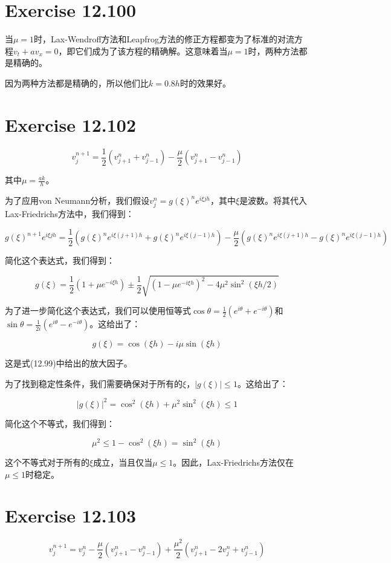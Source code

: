 \documentclass[twoside,a4paper]{article}
\begin{document}
\section{Exercise 12.100}
当$\mu = 1$时，Lax-Wendroff方法和Leapfrog方法的修正方程都变为了标准的对流方程$v_t + av_x = 0$，即它们成为了该方程的精确解。这意味着当$\mu = 1$时，两种方法都是精确的。

因为两种方法都是精确的，所以他们比$k=0.8h$时的效果好。
\section{Exercise 12.102}
$$
v_j^{n+1} = \frac{1}{2}(v_{j+1}^n + v_{j-1}^n) - \frac{\mu}{2}(v_{j+1}^n - v_{j-1}^n)
$$

其中$\mu = \frac{ak}{h}$。

为了应用von Neumann分析，我们假设$v_j^n = g(\xi)^ne^{i\xi jh}$，其中$\xi$是波数。将其代入Lax-Friedrichs方法中，我们得到：

$$
g(\xi)^{n+1}e^{i\xi jh} = \frac{1}{2}(g(\xi)^ne^{i\xi(j+1)h} + g(\xi)^ne^{i\xi(j-1)h}) - \frac{\mu}{2}(g(\xi)^ne^{i\xi(j+1)h} - g(\xi)^ne^{i\xi(j-1)h})
$$

简化这个表达式，我们得到：

$$
g(\xi) = \frac{1}{2}(1+\mu e^{-i\xi h}) \pm \frac{1}{2}\sqrt{(1-\mu e^{-i\xi h})^2 - 4\mu^2\sin^2(\xi h/2)}
$$

为了进一步简化这个表达式，我们可以使用恒等式$\cos\theta = \frac{1}{2}(e^{i\theta} + e^{-i\theta})$和$\sin\theta = \frac{1}{2i}(e^{i\theta} - e^{-i\theta})$。这给出了：

$$
g(\xi) = \cos(\xi h) - i\mu\sin(\xi h)
$$

这是式(12.99)中给出的放大因子。

为了找到稳定性条件，我们需要确保对于所有的$\xi$，$|g(\xi)| \leq 1$。这给出了：

$$
|g(\xi)|^2 = \cos^2(\xi h) + \mu^2\sin^2(\xi h) \leq 1
$$

简化这个不等式，我们得到：

$$
\mu^2 \leq 1 - \cos^2(\xi h) = \sin^2(\xi h)
$$

这个不等式对于所有的$\xi$成立，当且仅当$\mu \leq 1$。因此，Lax-Friedrichs方法仅在$\mu \leq 1$时稳定。
\section{Exercise 12.103}

$$
v_j^{n+1} = v_j^n - \frac{\mu}{2}(v_{j+1}^n - v_{j-1}^n) + \frac{\mu^2}{2}(v_{j+1}^n - 2v_j^n + v_{j-1}^n)
$$
\end{document}
